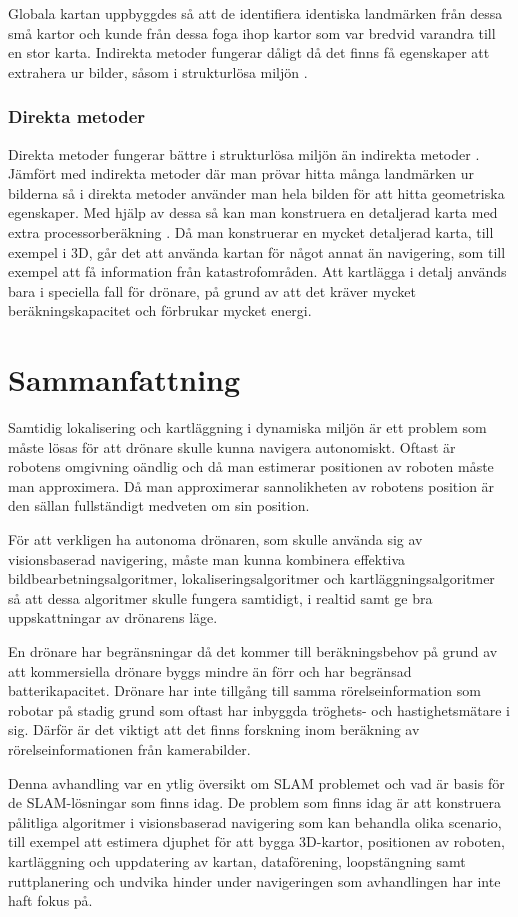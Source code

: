 Globala kartan uppbyggdes så att de identifiera identiska landmärken från dessa små kartor och kunde från dessa foga ihop kartor som var bredvid varandra till en stor karta. Indirekta metoder fungerar dåligt då det finns få egenskaper att extrahera ur bilder, såsom i strukturlösa miljön \citep{geospatial}.

\subsection{Direkta metoder}

Direkta metoder fungerar bättre i strukturlösa miljön än indirekta metoder \citep{Engel2014LSDSLAMLD}. Jämfört med indirekta metoder där man prövar hitta många landmärken ur bilderna så i direkta metoder använder man hela bilden för att hitta geometriska egenskaper. Med hjälp av dessa så kan man konstruera en detaljerad karta med extra processorberäkning \citep{geospatial}. Då man konstruerar en mycket detaljerad karta, till exempel i 3D, går det att använda kartan för något annat än navigering, som till exempel att få information från katastrofområden. Att kartlägga i detalj används bara i speciella fall för drönare, på grund av att det kräver mycket beräkningskapacitet och förbrukar mycket energi.

\chapter{Sammanfattning}

Samtidig lokalisering och kartläggning i dynamiska miljön är ett problem som måste lösas för att drönare skulle kunna navigera autonomiskt. Oftast är robotens omgivning oändlig och då man estimerar positionen av roboten måste man approximera. Då man approximerar sannolikheten av robotens position är den sällan fullständigt medveten om sin position. 

För att verkligen ha autonoma drönaren, som skulle använda sig av visionsbaserad navigering, måste man kunna kombinera effektiva bildbearbetningsalgoritmer, lokaliseringsalgoritmer och kartläggningsalgoritmer så att dessa algoritmer skulle fungera samtidigt, i realtid samt ge bra uppskattningar av drönarens läge. 

En drönare har begränsningar då det kommer till beräkningsbehov på grund av att kommersiella drönare byggs mindre än förr och har begränsad batterikapacitet. Drönare har inte tillgång till samma rörelseinformation som robotar på stadig grund som oftast har inbyggda tröghets- och hastighetsmätare i sig. Därför är det viktigt att det finns forskning inom beräkning av rörelseinformationen från kamerabilder. 

Denna avhandling var en ytlig översikt om SLAM problemet och vad är basis för de SLAM-lösningar som finns idag. De problem som finns idag är att konstruera pålitliga algoritmer i visionsbaserad navigering som kan behandla olika scenario, till exempel att estimera djuphet för att bygga 3D-kartor, positionen av roboten, kartläggning och uppdatering av kartan, dataförening, loopstängning samt ruttplanering och undvika hinder under navigeringen som avhandlingen har inte haft fokus på.


